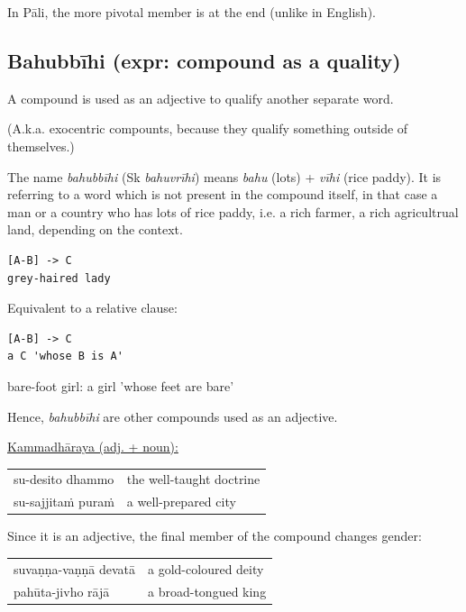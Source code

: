 \documentclass[11pt,oneside]{memoir}
\begin{document}
In Pāli, the more pivotal member is at the end (unlike in English).

\subsection{Bahubbīhi (expr: compound as a quality)}
\label{sec:orgdb60261}

A compound is used as an adjective to qualify another separate word.

(A.k.a. exocentric compounts, because they qualify something outside of themselves.)

The name \emph{bahubbīhi} (Sk \emph{bahuvrīhi}) means \emph{bahu} (lots) + \emph{vīhi} (rice paddy).
It is referring to a word which is not present in the compound itself,
in that case a man or a country who has lots of rice paddy, i.e. a rich farmer,
a rich agricultrual land, depending on the context.

\begin{verbatim}
[A-B] -> C
grey-haired lady
\end{verbatim}


Equivalent to a relative clause:

\begin{verbatim}
[A-B] -> C
a C 'whose B is A'
\end{verbatim}


bare-foot girl: a girl 'whose feet are bare'

Hence, \emph{bahubbīhi} are other compounds used as an adjective.

\uline{Kammadhāraya (adj. + noun):}

\begin{center}
\begin{tabular}{ll}
su-desito dhammo & the well-taught doctrine\\[0pt]
su-sajjitaṁ puraṁ & a well-prepared city\\[0pt]
\end{tabular}
\end{center}

Since it is an adjective, the final member of the compound changes gender:

\begin{center}
\begin{tabular}{ll}
suvaṇṇa-vaṇṇā devatā & a gold-coloured deity\\[0pt]
pahūta-jivho rājā & a broad-tongued king\\[0pt]
\end{tabular}
\end{center}
\end{document}
